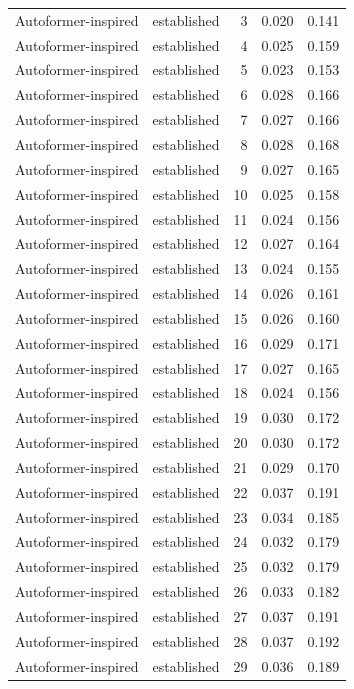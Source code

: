 \begin{tabular}{llrrr}
Autoformer-inspired & established & 3 & 0.020 & 0.141 \\
Autoformer-inspired & established & 4 & 0.025 & 0.159 \\
Autoformer-inspired & established & 5 & 0.023 & 0.153 \\
Autoformer-inspired & established & 6 & 0.028 & 0.166 \\
Autoformer-inspired & established & 7 & 0.027 & 0.166 \\
Autoformer-inspired & established & 8 & 0.028 & 0.168 \\
Autoformer-inspired & established & 9 & 0.027 & 0.165 \\
Autoformer-inspired & established & 10 & 0.025 & 0.158 \\
Autoformer-inspired & established & 11 & 0.024 & 0.156 \\
Autoformer-inspired & established & 12 & 0.027 & 0.164 \\
Autoformer-inspired & established & 13 & 0.024 & 0.155 \\
Autoformer-inspired & established & 14 & 0.026 & 0.161 \\
Autoformer-inspired & established & 15 & 0.026 & 0.160 \\
Autoformer-inspired & established & 16 & 0.029 & 0.171 \\
Autoformer-inspired & established & 17 & 0.027 & 0.165 \\
Autoformer-inspired & established & 18 & 0.024 & 0.156 \\
Autoformer-inspired & established & 19 & 0.030 & 0.172 \\
Autoformer-inspired & established & 20 & 0.030 & 0.172 \\
Autoformer-inspired & established & 21 & 0.029 & 0.170 \\
Autoformer-inspired & established & 22 & 0.037 & 0.191 \\
Autoformer-inspired & established & 23 & 0.034 & 0.185 \\
Autoformer-inspired & established & 24 & 0.032 & 0.179 \\
Autoformer-inspired & established & 25 & 0.032 & 0.179 \\
Autoformer-inspired & established & 26 & 0.033 & 0.182 \\
Autoformer-inspired & established & 27 & 0.037 & 0.191 \\
Autoformer-inspired & established & 28 & 0.037 & 0.192 \\
Autoformer-inspired & established & 29 & 0.036 & 0.189 \\

\end{tabular}
